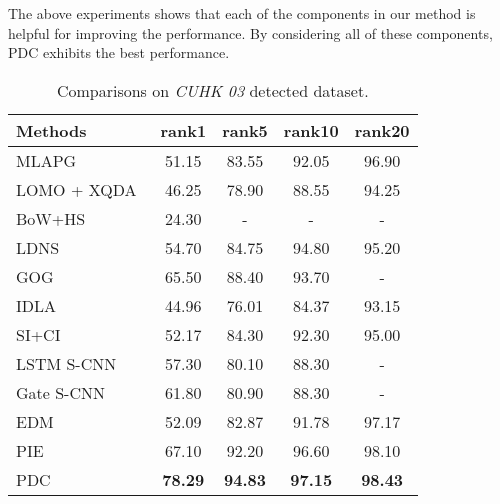 \documentclass[10pt,twocolumn,letterpaper]{article}
\begin{document}
The above experiments shows that each of the components in our method is helpful for improving the performance. By considering all of these components, PDC exhibits the best performance.


\begin{table}
\caption{Comparisons on \emph{CUHK 03} detected dataset.}
\label{table:cuhk03det}
\footnotesize
\begin{center}
\begin{tabular}{|l|cccc|}
\hline
 Methods            &rank1    &rank5    &rank10   &rank20 \\
\hline
MLAPG~\cite{liao2015efficient} &51.15    &83.55    &92.05    &96.90\\
LOMO + XQDA~\cite{liao2015person} &46.25    &78.90    &88.55    &94.25\\
BoW+HS~\cite{zheng2015scalable}       &24.30    &-    &-    &-  \\
LDNS~\cite{zhang2016learning}     &54.70    &84.75    &94.80    &95.20\\
GOG~\cite{matsukawa2016hierarchical} &65.50 &88.40 &93.70 &- \\
\hline
IDLA~\cite{ahmed5improved}  &44.96    &76.01    &84.37    &93.15\\
SI+CI~\cite{wangjoint}  &52.17    &84.30    &92.30    &95.00\\
LSTM S-CNN~\cite{varior2016siamese}      &57.30     &80.10    &88.30    &-    \\
Gate S-CNN~\cite{varior2016gated} &61.80    &80.90    &88.30    &-\\
 EDM~\cite{shi2016embedding}      &52.09   &82.87   &91.78&97.17\\
\hline
PIE~\cite{zheng2017pose}    &67.10   &92.20   &96.60 &98.10\\
\hline
PDC       &{\bf78.29}   &{\bf94.83}   &{\bf97.15}   &{\bf98.43}\\
\hline
\end{tabular}
\end{center}
\vspace{-7mm}
\end{table}
\end{document}
